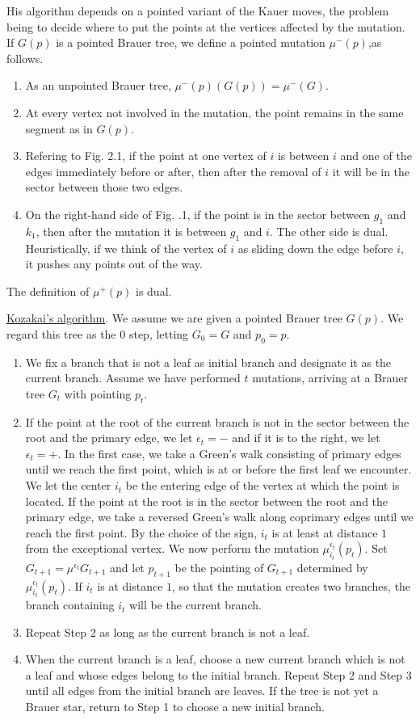 \documentclass[11pt,english]{article}
\numberwithin{figure}{section}
\numberwithin{equation}{section}
\numberwithin{table}{section}
\theoremstyle{definition}
\theoremstyle{remark}
\begin{document}
His algorithm depends on a pointed variant of the Kauer moves, the problem being to decide where to put the points at the vertices affected by the mutation. If $G(p)$ is a pointed Brauer tree, we define a pointed mutation $\mu^-(p)$,as follows.
\begin{enumerate}
	\item As an unpointed Brauer tree, $\mu^-(p)(G(p))= \mu^-(G)$.
	\item At every vertex not involved in the mutation, the point remains in the same segment as in $G(p)$.
	\item Refering to Fig. 2.1, if the point at one vertex of $i$  is between $i$ and one of the edges immediately before or after, then after the removal of $i$ it will be in the sector between those two edges.
	\item On the right-hand side of Fig. .1, if the point is in the sector between $g_1$ and $k_1$, then after the mutation it is between $g_1$ and $i$. The other side is dual. Heuristically, if we think of the vertex of $i$ as sliding down the edge before $i$, it pushes any points out of the way.
\end{enumerate}

\noindent The definition of $\mu^+(p)$ is dual.


\noindent \uline{Kozakai's algorithm}\cite{K}.
\noindent We assume we are given a pointed Brauer tree $G(p)$. We regard this tree as the $0$ step, letting 
$G_0=G$ and $p_0=p$.
\begin{enumerate}
	\item We fix a branch that is not a leaf as initial branch and designate it as the current branch.  Assume we have performed $t$ mutations, arriving at a Brauer tree $G_t$ with pointing $p_t$.
	\item If the point at the root of the current branch is not in the sector between the root and the primary edge, we let $\epsilon_t=-$ and if it is to the right, we let $\epsilon_t=+$. In the first case, we take a Green's walk consisting of primary edges until we reach the first point, which is at or before the first leaf we encounter.   We let the center $i_t$ be the  entering edge of the vertex at which the point is located. If the point at the root is in the sector between the root and the primary edge, we take a reversed Green's walk along coprimary edges until we reach the first point. By the choice of the sign, $i_t$ is at least at distance $1$ from the exceptional vertex. We now perform the mutation $\mu_{i_t}^{\epsilon_t}(p_t)$. Set $G_{t+1}=\mu^{\epsilon_t}G_{t+1}$ and let $p_{t+1}$ be the pointing of $G_{t+1}$ determined by $\mu_{i_t}^{\epsilon_t}(p_t)$. If $i_t$ is at distance $1$, so that the mutation creates two branches, the branch containing $i_t$ will be the current branch.
	\item Repeat Step 2 as long as the current branch is not a leaf. 
	\item When the current branch is a leaf, choose a new current branch  which is not a leaf and whose edges belong to the initial branch. Repeat Step 2 and Step 3 until all edges from the initial branch are leaves. If the tree is not yet a Brauer star, return to Step 1 to choose a new initial branch.
	\end{enumerate}
	
\end{document}
